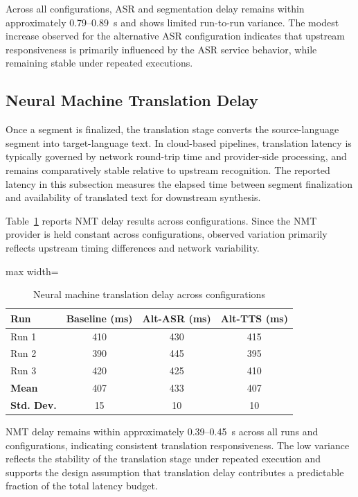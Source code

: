 Across all configurations, ASR and segmentation delay remains within approximately 0.79--0.89~s and shows limited run-to-run variance. The modest increase observed for the alternative ASR configuration indicates that upstream responsiveness is primarily influenced by the ASR service behavior, while remaining stable under repeated executions.

\subsection{Neural Machine Translation Delay}
\label{sec:nmt_delay}

Once a segment is finalized, the translation stage converts the source-language segment into target-language text. In cloud-based pipelines, translation latency is typically governed by network round-trip time and provider-side processing, and remains comparatively stable relative to upstream recognition. The reported latency in this subsection measures the elapsed time between segment finalization and availability of translated text for downstream synthesis.

Table~\ref{tab:nmt_delay} reports NMT delay results across configurations. Since the NMT provider is held constant across configurations, observed variation primarily reflects upstream timing differences and network variability.

\begin{table}[!htbp]
\centering
\caption[Neural machine translation delay]{Neural machine translation delay across configurations}
\label{tab:nmt_delay}
\begin{adjustbox}{max width=\textwidth}
\begin{tabular}{lccc}
\toprule
\textbf{Run} & \textbf{Baseline (ms)} & \textbf{Alt-ASR (ms)} & \textbf{Alt-TTS (ms)} \\
\midrule
Run 1 & 410 & 430 & 415 \\
Run 2 & 390 & 445 & 395 \\
Run 3 & 420 & 425 & 410 \\
\midrule
\textbf{Mean} & 407 & 433 & 407 \\
\textbf{Std. Dev.} & 15 & 10 & 10 \\
\bottomrule
\end{tabular}
\end{adjustbox}
\end{table}

NMT delay remains within approximately 0.39--0.45~s across all runs and configurations, indicating consistent translation responsiveness. The low variance reflects the stability of the translation stage under repeated execution and supports the design assumption that translation delay contributes a predictable fraction of the total latency budget.

